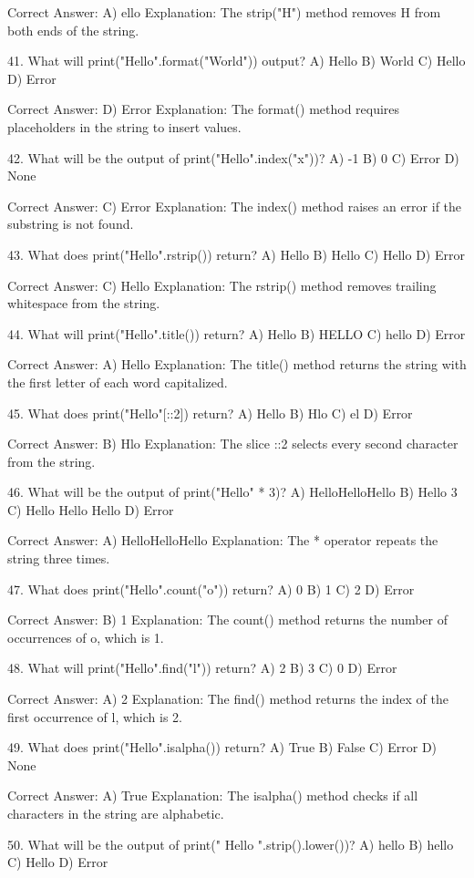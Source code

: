 Correct Answer: A) ello
Explanation: The strip("H") method removes H from both ends of the string.

41. What will print("Hello".format("World")) output?
A) Hello
B) World
C) Hello {}
D) Error

Correct Answer: D) Error
Explanation: The format() method requires placeholders in the string to insert values.

42. What will be the output of print("Hello".index("x"))?
A) -1
B) 0
C) Error
D) None

Correct Answer: C) Error
Explanation: The index() method raises an error if the substring is not found.

43. What does print("Hello".rstrip()) return?
A) Hello
B) Hello
C) Hello
D) Error

Correct Answer: C) Hello
Explanation: The rstrip() method removes trailing whitespace from the string.

44. What will print("Hello".title()) return?
A) Hello
B) HELLO
C) hello
D) Error

Correct Answer: A) Hello
Explanation: The title() method returns the string with the first letter of each word capitalized.

45. What does print("Hello"[::2]) return?
A) Hello
B) Hlo
C) el
D) Error

Correct Answer: B) Hlo
Explanation: The slice ::2 selects every second character from the string.

46. What will be the output of print("Hello" * 3)?
A) HelloHelloHello
B) Hello 3
C) Hello Hello Hello
D) Error

Correct Answer: A) HelloHelloHello
Explanation: The * operator repeats the string three times.

47. What does print("Hello".count("o")) return?
A) 0
B) 1
C) 2
D) Error

Correct Answer: B) 1
Explanation: The count() method returns the number of occurrences of o, which is 1.

48. What will print("Hello".find("l")) return?
A) 2
B) 3
C) 0
D) Error

Correct Answer: A) 2
Explanation: The find() method returns the index of the first occurrence of l, which is 2.

49. What does print("Hello".isalpha()) return?
A) True
B) False
C) Error
D) None

Correct Answer: A) True
Explanation: The isalpha() method checks if all characters in the string are alphabetic.

50. What will be the output of print(" Hello ".strip().lower())?
A) hello
B) hello
C) Hello
D) Error

